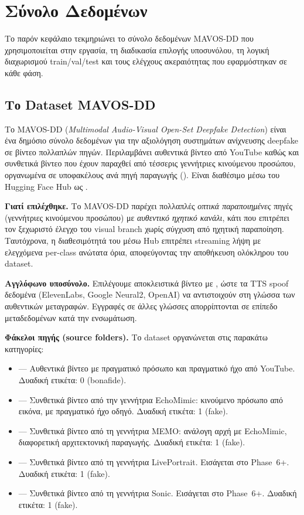 \chapter{Σύνολο Δεδομένων}

Το παρόν κεφάλαιο τεκμηριώνει το σύνολο δεδομένων MAVOS-DD που χρησιμοποιείται
στην εργασία, τη διαδικασία επιλογής υποσυνόλου, τη λογική διαχωρισμού train/val/test
και τους ελέγχους ακεραιότητας που εφαρμόστηκαν σε κάθε φάση.

\section{Το Dataset MAVOS-DD}

Το MAVOS-DD (\textit{Multimodal Audio-Visual Open-Set Deepfake Detection}) είναι
ένα δημόσιο σύνολο δεδομένων για την αξιολόγηση συστημάτων ανίχνευσης deepfake
σε βίντεο πολλαπλών πηγών. Περιλαμβάνει αυθεντικά βίντεο από YouTube καθώς
και συνθετικά βίντεο που έχουν παραχθεί από τέσσερις γεννήτριες κινούμενου
προσώπου, οργανωμένα σε υποφακέλους ανά πηγή παραγωγής ().
Είναι διαθέσιμο μέσω του Hugging Face Hub ως .

\textbf{Γιατί επιλέχθηκε.} Το MAVOS-DD παρέχει πολλαπλές \emph{οπτικά παραποιημένες}
πηγές (γεννήτριες κινούμενου προσώπου) με \emph{αυθεντικό ηχητικό κανάλι},
κάτι που επιτρέπει τον ξεχωριστό έλεγχο του visual branch χωρίς σύγχυση από
ηχητική παραποίηση. Ταυτόχρονα, η διαθεσιμότητά του μέσω Hub επιτρέπει
streaming λήψη με ελεγχόμενα per-class ανώτατα όρια, αποφεύγοντας
την αποθήκευση ολόκληρου του dataset.

\textbf{Αγγλόφωνο υποσύνολο.} Επιλέγουμε αποκλειστικά βίντεο με
, ώστε τα TTS spoof δεδομένα (ElevenLabs, Google Neural2,
OpenAI) να αντιστοιχούν στη γλώσσα των αυθεντικών μεταγραφών. Εγγραφές
σε άλλες γλώσσες απορρίπτονται σε επίπεδο μεταδεδομένων κατά την ενσωμάτωση.

\textbf{Φάκελοι πηγής (source folders).} Το dataset οργανώνεται
στις παρακάτω κατηγορίες:

\begin{itemize}
  \item {} — Αυθεντικά βίντεο με πραγματικό πρόσωπο και πραγματικό ήχο
    από YouTube. Δυαδική ετικέτα: 0 (bonafide).
  \item {} — Συνθετικά βίντεο από την γεννήτρια EchoMimic:
    κινούμενο πρόσωπο από εικόνα, με πραγματικό ήχο οδηγό.
    Δυαδική ετικέτα: 1 (fake).
  \item {} — Συνθετικά βίντεο από τη γεννήτρια MEMO:
    ανάλογη αρχή με EchoMimic, διαφορετική αρχιτεκτονική παραγωγής.
    Δυαδική ετικέτα: 1 (fake).
  \item {} — Συνθετικά βίντεο από τη γεννήτρια LivePortrait.
    Εισάγεται στο Phase~6+. Δυαδική ετικέτα: 1 (fake).
  \item {} — Συνθετικά βίντεο από τη γεννήτρια Sonic.
    Εισάγεται στο Phase~6+. Δυαδική ετικέτα: 1 (fake).
\end{itemize}

